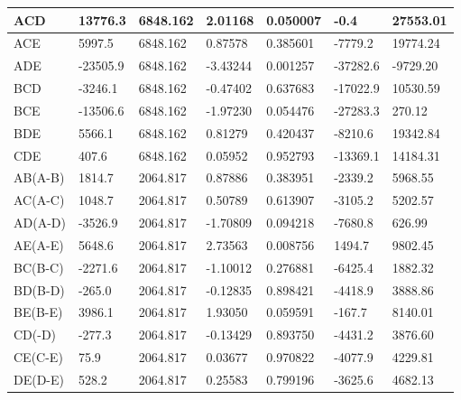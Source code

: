 \documentclass[materials,article,submit,pdftex,moreauthors]{Definitions/mdpi}
\begin{document}
\begin{ThreePartTable}
\begin{footnotesize}
\begin{longtable}{|l|l|l|l|l|l|l|}
        ACD & 13776.3 & 6848.162 & 2.01168 & 0.050007 & -0.4 & 27553.01 \\ \hline
        ACE & 5997.5 & 6848.162 & 0.87578 & 0.385601 & -7779.2 & 19774.24 \\ \hline
        \rowcolor{LightCyan}
        ADE & -23505.9 & 6848.162 & -3.43244 & 0.001257 & -37282.6 & -9729.20 \\ \hline
        BCD & -3246.1 & 6848.162 & -0.47402 & 0.637683 & -17022.9 & 10530.59 \\ \hline
        BCE & -13506.6 & 6848.162 & -1.97230 & 0.054476 & -27283.3 & 270.12 \\ \hline
        BDE & 5566.1 & 6848.162 & 0.81279 & 0.420437 & -8210.6 & 19342.84 \\ \hline
        CDE & 407.6 & 6848.162 & 0.05952 & 0.952793 & -13369.1 & 14184.31 \\ \hline
        AB(A-B) & 1814.7 & 2064.817 & 0.87886 & 0.383951 & -2339.2 & 5968.55 \\ \hline
        AC(A-C) & 1048.7 & 2064.817 & 0.50789 & 0.613907 & -3105.2 & 5202.57 \\ \hline
        AD(A-D) & -3526.9 & 2064.817 & -1.70809 & 0.094218 & -7680.8 & 626.99 \\ \hline
        \rowcolor{LightCyan}
        AE(A-E) & 5648.6 & 2064.817 & 2.73563 & 0.008756 & 1494.7 & 9802.45 \\ \hline
        BC(B-C) & -2271.6 & 2064.817 & -1.10012 & 0.276881 & -6425.4 & 1882.32 \\ \hline
        BD(B-D) & -265.0 & 2064.817 & -0.12835 & 0.898421 & -4418.9 & 3888.86 \\ \hline
        BE(B-E) & 3986.1 & 2064.817 & 1.93050 & 0.059591 & -167.7 & 8140.01 \\ \hline
        CD(-D) & -277.3 & 2064.817 & -0.13429 & 0.893750 & -4431.2 & 3876.60 \\ \hline
        CE(C-E) & 75.9 & 2064.817 & 0.03677 & 0.970822 & -4077.9 & 4229.81 \\ \hline
        DE(D-E) & 528.2 & 2064.817 & 0.25583 & 0.799196 & -3625.6 & 4682.13 \\ \hline
\end{longtable}
\end{footnotesize}
\end{ThreePartTable}
\end{document}
